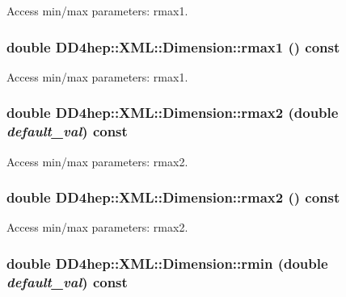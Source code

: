 Access min/max parameters: rmax1. \hypertarget{struct_d_d4hep_1_1_x_m_l_1_1_dimension_a560c32c64f0272b16e5cba8868c8f69f}{
\subsubsection[{rmax1}]{\setlength{\rightskip}{0pt plus 5cm}double DD4hep::XML::Dimension::rmax1 () const}}
\label{struct_d_d4hep_1_1_x_m_l_1_1_dimension_a560c32c64f0272b16e5cba8868c8f69f}


Access min/max parameters: rmax1. \hypertarget{struct_d_d4hep_1_1_x_m_l_1_1_dimension_a0611984843d83b2c40c35c8f0d38ce37}{
\subsubsection[{rmax2}]{\setlength{\rightskip}{0pt plus 5cm}double DD4hep::XML::Dimension::rmax2 (double {\em default\_\-val}) const}}
\label{struct_d_d4hep_1_1_x_m_l_1_1_dimension_a0611984843d83b2c40c35c8f0d38ce37}


Access min/max parameters: rmax2. \hypertarget{struct_d_d4hep_1_1_x_m_l_1_1_dimension_ab09b37511fc146efb96b25b19a56ae3a}{
\subsubsection[{rmax2}]{\setlength{\rightskip}{0pt plus 5cm}double DD4hep::XML::Dimension::rmax2 () const}}
\label{struct_d_d4hep_1_1_x_m_l_1_1_dimension_ab09b37511fc146efb96b25b19a56ae3a}


Access min/max parameters: rmax2. \hypertarget{struct_d_d4hep_1_1_x_m_l_1_1_dimension_aed981615e11c304f936c48f8da6e94ee}{
\subsubsection[{rmin}]{\setlength{\rightskip}{0pt plus 5cm}double DD4hep::XML::Dimension::rmin (double {\em default\_\-val}) const}}
\label{struct_d_d4hep_1_1_x_m_l_1_1_dimension_aed981615e11c304f936c48f8da6e94ee}


